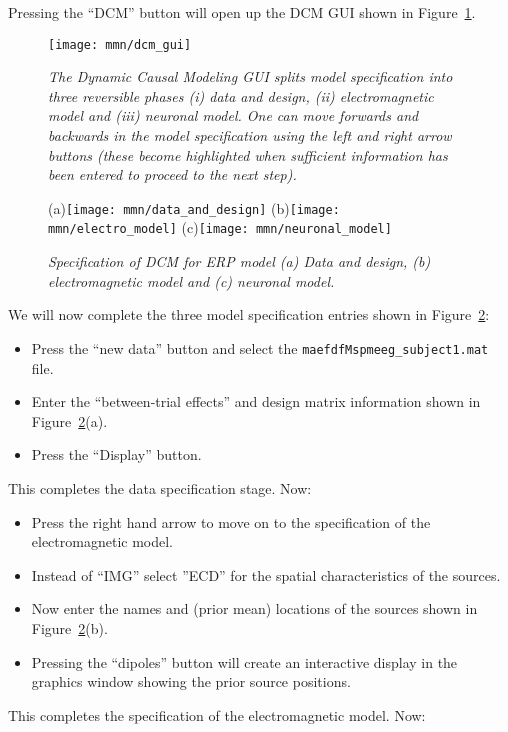 Pressing the ``DCM'' button will open up the DCM GUI shown in Figure~\ref{dcm_gui}.
\begin{figure}
\begin{center}
\texttt{[image: mmn/dcm\_gui]}
\caption{\em The Dynamic Causal Modeling GUI splits model specification into three reversible phases (i) data and design, (ii) electromagnetic model and (iii) neuronal model. One can move forwards and backwards in the model specification using the left and right arrow buttons (these become highlighted when sufficient information has been entered to proceed to the next step).
\label{dcm_gui}}
\end{center}
\end{figure}
\begin{figure}
\begin{center}
(a)\texttt{[image: mmn/data\_and\_design]}
(b)\texttt{[image: mmn/electro\_model]}
(c)\texttt{[image: mmn/neuronal\_model]}
\caption{\em Specification of DCM for ERP model (a) Data and design, (b) electromagnetic model and (c) neuronal model.
\label{specify} }
\end{center}
\end{figure}
We will now complete the three model specification entries shown in Figure~\ref{specify}:
\begin{itemize}
\item{Press the ``new data'' button and select the \texttt{maefdfMspmeeg\_subject1.mat} file.}
\item{Enter the ``between-trial effects'' and design matrix information shown in Figure~\ref{specify}(a).}
\item{Press the ``Display'' button.}
\end{itemize}
This completes the data specification stage. Now:
\begin{itemize}
\item{Press the right hand arrow to move on to the specification of the electromagnetic model.}
\item{Instead of ``IMG'' select ''ECD'' for the spatial characteristics of the sources.}
\item{Now enter the names and (prior mean) locations of the sources shown in Figure~\ref{specify}(b).}
\item{Pressing the ``dipoles'' button will create an interactive display in the graphics window showing the prior source positions.}
\end{itemize}
This completes the specification of the electromagnetic model. Now:
